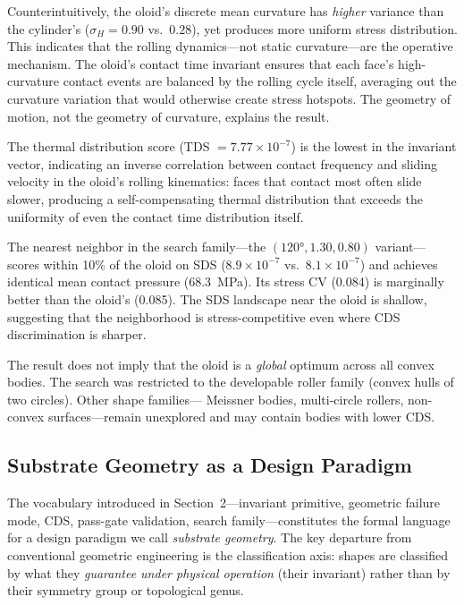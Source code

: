 \documentclass[11pt,a4paper]{article}
\begin{document}
Counterintuitively, the oloid's discrete mean curvature has
\emph{higher} variance than the cylinder's ($\sigma_H = 0.90$ vs.\
$0.28$), yet produces more uniform stress distribution. This indicates
that the rolling dynamics---not static curvature---are the operative
mechanism. The oloid's contact time invariant ensures that each face's
high-curvature contact events are balanced by the rolling cycle itself,
averaging out the curvature variation that would otherwise create stress
hotspots. The geometry of motion, not the geometry of curvature,
explains the result.

The thermal distribution score (TDS $= 7.77 \times 10^{-7}$) is the lowest in the invariant vector, indicating an inverse correlation between contact frequency and sliding velocity in the oloid's rolling kinematics: faces that contact most often slide slower, producing a self-compensating thermal distribution that exceeds the uniformity of even the contact time distribution itself.

The nearest neighbor in the search family---the $(120°, 1.30, 0.80)$
variant---scores within 10\% of the oloid on SDS ($8.9 \times 10^{-7}$
vs.\ $8.1 \times 10^{-7}$) and achieves identical mean contact pressure
(68.3~MPa). Its stress CV (0.084) is marginally better than the oloid's
(0.085). The SDS landscape near the oloid is shallow, suggesting that
the neighborhood is stress-competitive even where CDS discrimination
is sharper.

The result does not imply that the oloid is a \emph{global} optimum
across all convex bodies. The search was restricted to the developable
roller family (convex hulls of two circles). Other shape families---
Meissner bodies, multi-circle rollers, non-convex surfaces---remain
unexplored and may contain bodies with lower CDS.

\subsection{Substrate Geometry as a Design Paradigm}

The vocabulary introduced in Section~2---invariant primitive, geometric
failure mode, CDS, pass-gate validation, search family---constitutes
the formal language for a design paradigm we call \emph{substrate
geometry}. The key departure from conventional geometric engineering
is the classification axis: shapes are classified by what they
\emph{guarantee under physical operation} (their invariant) rather
than by their symmetry group or topological genus.
\end{document}
